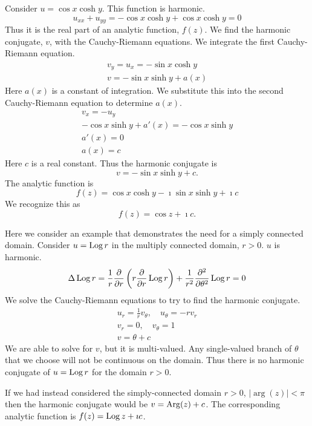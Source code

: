 \begin{Example}
  Consider $u = \cos x \cosh y$.  This function is harmonic.
  \[
  u_{x x} + u_{y y} = - \cos x \cosh y + \cos x \cosh y = 0
  \]
  Thus it is the real part of an analytic function, $f(z)$.
  We find the harmonic conjugate, $v$, with the Cauchy-Riemann equations.
  We integrate the first Cauchy-Riemann equation.
  \begin{gather*}
    v_y = u_x = - \sin x \cosh y 
    \\
    v = - \sin x \sinh y + a(x)
  \end{gather*}
  Here $a(x)$ is a constant of integration.  We substitute this into the second
  Cauchy-Riemann equation to determine $a(x)$.
  \begin{gather*}
    v_x = - u_y 
    \\
    - \cos x \sinh y + a'(x) = - \cos x \sinh y 
    \\
    a'(x) = 0 
    \\
    a(x) = c
  \end{gather*}
  Here $c$ is a real constant.  Thus the harmonic conjugate is
  \[
  v = - \sin x \sinh y + c.
  \]
  The analytic function is
  \[
  f(z) = \cos x \cosh y - \imath \sin x \sinh y + \imath c
  \]
  We recognize this as 
  \[
  f(z) = \cos z + \imath c.
  \]
\end{Example}




\begin{Example}
  Here we consider an example that demonstrates the need for a simply connected
  domain.  Consider $u = \mathop{\mathrm{Log}}\nolimits r$ in the multiply connected domain, $r > 0$.
  $u$ is harmonic.
  \[
  \Delta \mathop{\mathrm{Log}}\nolimits r = \frac{1}{r} \frac{\partial}{\partial r} \left( r \frac{\partial}{\partial r} \mathop{\mathrm{Log}}\nolimits r \right)
  + \frac{1}{r^2} \frac{\partial^2}{\partial \theta^2} \mathop{\mathrm{Log}}\nolimits r = 0
  \]
  We solve the Cauchy-Riemann equations to try to find the harmonic conjugate.
  \begin{gather*}
    u_r = \frac{1}{r} v_\theta, \quad u_\theta = -r v_r 
    \\
    v_r = 0, \quad v_\theta = 1 
    \\
    v = \theta + c
  \end{gather*}
  We are able to solve for $v$, but it is multi-valued.  Any single-valued 
  branch of $\theta$ that we choose will not be continuous on the domain.  Thus
  there is no harmonic conjugate of $u = \mathop{\mathrm{Log}}\nolimits r$ for the domain $r > 0$.

  If we had instead considered the simply-connected domain $r > 0$, 
  $|\arg(z)| < \pi$ then the harmonic conjugate would be
  $v = \mathop{\mathrm{Arg}}\nolimits(z) + c$.  The corresponding analytic function is 
  $f(z) = \mathop{\mathrm{Log}}\nolimits z + \imath c$.
\end{Example}






